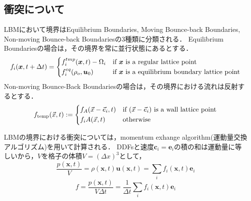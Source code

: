 \subsection{衝突について}
LBMにおいて境界はEquilibrium Boundaries, Moving Bounce-back Boundaries, Non-moving Bounce-back Boundariesの3種類に分類される．
Equilibrium Boundariesの場合は，その境界を常に並行状態にあるとする．
\begin{equation}
    f_i(\bm{x}, t+\Delta t) =
    \begin{dcases}
        f^{tmp}_{i}(\bm{x}, t) - \Omega_i & \text{if $\bm{x}$ is a regular lattice point}              \\
        f^{eq}_{i}(\rho_o, \bm{u}_0)       & \text{if $\bm{x}$ is a equilibrium boundary lattice point}
    \end{dcases}
\end{equation}
Non-moving Bounce-Back Boundariesの場合は，その境界における流れは反射するとする．
\begin{equation}
    f_{\text{temp}}(\vec{x}, t) :=
    \begin{dcases}
        f_A(\vec{x} - \vec{e}_i, t) & \text{if } (\vec{x} - \vec{e}_i) \text{ is a wall lattice point} \\
        f_iA(\vec{x}, t)            & \text{otherwise}
    \end{dcases}
\end{equation}

LBMの境界における衝突については，momentum exhange algorithm(運動量交換アルゴリズム)を用いて計算される．
DDFsと速度$\bm{c}_i=\bm{e}_i$の積の和は運動量に等しいから，$V$を格子の体積$V=(\Delta x)^3$として，
\begin{equation}\label{eq:momentum-exchange}
    \frac{p(\bm{x}, t)}{V} = \rho(\bm{x}, t) \bm{u}(\bm{x}, t) = \sum_i f_i(\bm{x}, t) \bm{e}_i
\end{equation}
\begin{equation}\label{eq:force}
    f = \frac{p(\bm{x}, t)}{V \Delta t} = \frac{1}{\Delta t} \sum_i f_i(\bm{x}, t) \bm{e}_i
\end{equation}